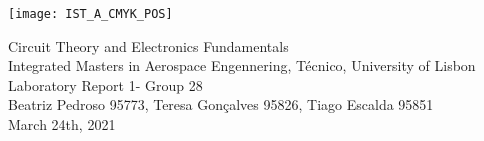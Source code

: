 
\thispagestyle {empty}

\texttt{[image: IST\_A\_CMYK\_POS]}

\begin{center}
%
\vspace{1.0cm}

\vspace{1cm}
{\FontLb Circuit Theory and Electronics Fundamentals} \\ %
\vspace{1cm}
{\FontSn Integrated Masters in Aerospace Engennering, Técnico, University of Lisbon} \\ %
\vspace{1cm}
{\FontSn Laboratory Report 1- Group 28} \\
\vspace{1cm}
{\FontSn Beatriz Pedroso 95773, Teresa Gonçalves 95826, Tiago Escalda 95851}\\
\vspace{1cm}
{\FontSn March 24th, 2021} \\ %
%
\end{center}

